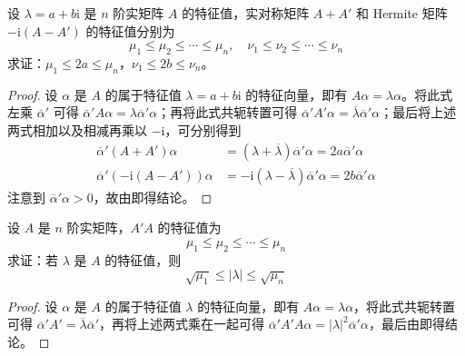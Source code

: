 \documentclass[../../main.tex]{subfiles}%
\begin{document}
\begin{example}\label{example:例9.54}
设 \(\lambda = a + b\mathrm{i}\) 是 \(n\) 阶实矩阵 \(A\) 的特征值，实对称矩阵 \(A + A'\) 和 Hermite 矩阵 \(-\mathrm{i}(A - A')\) 的特征值分别为
\[
\mu_1 \leqslant  \mu_2 \leqslant  \cdots \leqslant  \mu_n,\quad \nu_1 \leqslant  \nu_2 \leqslant  \cdots \leqslant  \nu_n
\]
求证：\(\mu_1 \leqslant  2a \leqslant  \mu_n\)，\(\nu_1 \leqslant  2b \leqslant  \nu_n\)。
\end{example}
\begin{proof}

设 \(\alpha\) 是 \(A\) 的属于特征值 \(\lambda = a + b\mathrm{i}\) 的特征向量，即有 \(A\alpha = \lambda\alpha\)。将此式左乘 \(\overline{\alpha}'\) 可得 \(\overline{\alpha}'A\alpha = \lambda\overline{\alpha}'\alpha\)；再将此式共轭转置可得 \(\overline{\alpha}'A'\alpha = \overline{\lambda}\overline{\alpha}'\alpha\)；最后将上述两式相加以及相减再乘以 \(-\mathrm{i}\)，可分别得到
\begin{align*}
\overline{\alpha}'(A + A')\alpha &= (\lambda + \overline{\lambda})\overline{\alpha}'\alpha = 2a\overline{\alpha}'\alpha\\
\overline{\alpha}'(-\mathrm{i}(A - A'))\alpha &= -\mathrm{i}(\lambda - \overline{\lambda})\overline{\alpha}'\alpha = 2b\overline{\alpha}'\alpha
\end{align*}
注意到 \(\overline{\alpha}'\alpha > 0\)，故由即得结论。 

\end{proof}

\begin{example}\label{example:例9.55}
设 \(A\) 是 \(n\) 阶实矩阵，\(A'A\) 的特征值为
\[
\mu_1 \leqslant  \mu_2 \leqslant  \cdots \leqslant  \mu_n
\]
求证：若 \(\lambda\) 是 \(A\) 的特征值，则
\[
\sqrt{\mu_1} \leqslant  |\lambda| \leqslant  \sqrt{\mu_n}
\]
\end{example}
\begin{proof}

设 \(\alpha\) 是 \(A\) 的属于特征值 \(\lambda\) 的特征向量，即有 \(A\alpha = \lambda\alpha\)，将此式共轭转置可得 \(\overline{\alpha}'A' = \overline{\lambda}\overline{\alpha}'\)，再将上述两式乘在一起可得 \(\overline{\alpha}'A'A\alpha = |\lambda|^2\overline{\alpha}'\alpha\)，最后由即得结论。 

\end{proof}
\end{document}
